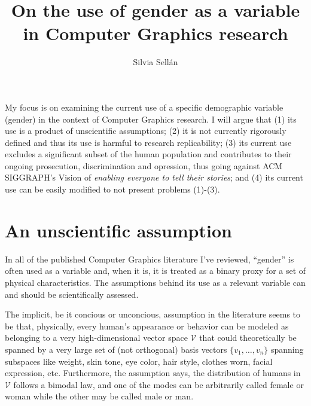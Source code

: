 \documentclass[acmtog,nonacm,review,balance=false]{acmart}
\begin{document}
\title{On the use of gender as a variable in Computer Graphics research}

\author{Silvia Sell\'{a}n} 

\begin{abstract}
\end{abstract}


\maketitle

\cite{phillips2020gamer}


My focus is on examining the current use of a specific demographic
variable (gender) in the context of Computer Graphics research. I will argue
that (1) its use is a product of unscientific assumptions; (2) it is not
currently rigorously defined and thus its use is harmful to research
replicability; (3) its current use excludes a significant subset of the human
population and contributes to their ongoing prosecution, discrimination and
opression, thus going against ACM SIGGRAPH's Vision of \emph{enabling everyone
to tell their stories}; and (4) its current use can be easily modified to not
present problems (1)-(3).

\section{An unscientific assumption}

In all of the published Computer Graphics literature I've reviewed, ``gender''
is often used as a variable and, when it is, it is treated as a binary proxy for
a set of physical characteristics. The assumptions behind its use as a relevant
variable can and should be scientifically assessed.

The implicit, be it concious or unconcious, assumption in the literature seems
to be that, physically, every human's appearance or behavior can be modeled as
belonging to a very high-dimensional vector space $\mathcal{V}$ that could
theoretically be spanned by a very large set of (not orthogonal) basis vectors
$\{v_1,\dots, v_n\}$ spanning subspaces like weight, skin tone, eye color, hair
style, clothes worn, facial expression, etc. Furthermore, the assumption says,
the distribution of humans in $\mathcal{V}$ follows a bimodal law, and one of
the modes can be arbitrarily called female or woman while the other may be
called male or man. 
\end{document}
